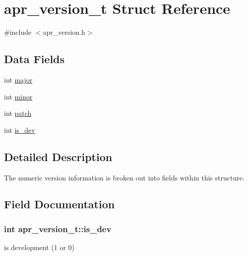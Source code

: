 \hypertarget{structapr__version__t}{}\section{apr\+\_\+version\+\_\+t Struct Reference}
\label{structapr__version__t}


{\ttfamily \#include $<$apr\+\_\+version.\+h$>$}

\subsection*{Data Fields}
\begin{DoxyCompactItemize}
\item 
int \hyperlink{structapr__version__t_a0ae64fee85387834ab76d9f9288373ab}{major}
\item 
int \hyperlink{structapr__version__t_aab0a1e8362517416389631bceeeedbad}{minor}
\item 
int \hyperlink{structapr__version__t_a98a629a88e776642d6e527d7535e0791}{patch}
\item 
int \hyperlink{structapr__version__t_aadc878af1010faa53e365e1142c81ced}{is\+\_\+dev}
\end{DoxyCompactItemize}


\subsection{Detailed Description}
The numeric version information is broken out into fields within this structure. 

\subsection{Field Documentation}
\subsubsection[{\texorpdfstring{is\+\_\+dev}{is_dev}}]{\setlength{\rightskip}{0pt plus 5cm}int apr\+\_\+version\+\_\+t\+::is\+\_\+dev}\hypertarget{structapr__version__t_aadc878af1010faa53e365e1142c81ced}{}\label{structapr__version__t_aadc878af1010faa53e365e1142c81ced}
is development (1 or 0) 
